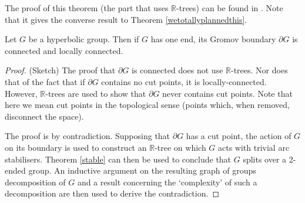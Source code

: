 The proof of this theorem (the part that uses $\mathbb{R}$-trees) can be found in \cite{S96}. Note that it gives the converse result to Theorem \ref{wetotallyplannedthis}.
\begin{theorem}
\label{twinning}
    Let $G$ be a hyperbolic group. Then if $G$ has one end, its Gromov boundary $\partial G$ is connected and locally connected.
\end{theorem}

\begin{proof}
    (Sketch) The proof that $\partial G$ is connected does not use $\mathbb{R}$-trees. Nor does that of the fact that if $\partial G$ contains no cut points, it is locally-connected. However, $\mathbb{R}$-trees are used to show that $\partial G$ never contains cut points. Note that here we mean cut points in the topological sense (points which, when removed, disconnect the space).
    
    The proof is by contradiction. Supposing that $\partial G$ has a cut point, the action of $G$ on its boundary is used to construct an $\mathbb{R}$-tree on which $G$ acts with trivial arc stabilisers. Theorem \ref{stable} can then be used to conclude that $G$ splits over a 2-ended group. An inductive argument on the resulting graph of groups decomposition of $G$ and a result concerning the `complexity' of such a decomposition are then used to derive the contradiction.
\end{proof}









